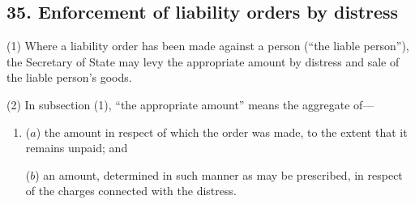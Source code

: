 \documentclass[12pt,a4paper]{article}
\begin{document}


\subsection{35. Enforcement of liability orders by 
distress
}

(1) Where a liability order has been made against a person (“the liable person”), the 
Secretary of State  %
may 
levy the appropriate amount by distress and sale of the liable person’s goods.

(2) In subsection (1), “the appropriate amount” means the aggregate of—
\begin{enumerate}\item[]
($a$) the amount in respect of which the order was made, to the extent that it remains unpaid; and

($b$) an amount, determined in such manner as may be prescribed, in respect of the charges connected with the distress.
\end{enumerate}
\end{document}
